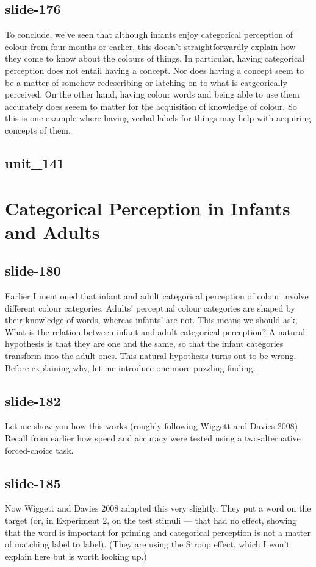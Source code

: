 \documentclass[12pt,\papersize]{extarticle}
\begin{document}
 
\subsection{slide-176}
To conclude, we've seen that although infants enjoy categorical perception of colour from four months or earlier,
this doesn't straightforwardly explain how they come to know about the colours of things.
In particular, having categorical perception does not entail having a concept.
Nor does having a concept seem to be a matter of somehow redescribing or latching on to what is catgeorically perceived.
On the other hand, having colour words and being able to use them accurately does seeem to matter for the acquisition of knowledge of colour.
So this is one example where having verbal labels for things may help with acquiring concepts of them.
 
 
\subsection{unit\_141}
 
\section{Categorical Perception in Infants and Adults}
 
 
\subsection{slide-180}
Earlier I mentioned that infant and adult categorical perception of colour involve different colour categories.
Adults’ perceptual colour categories are shaped by their knowledge of words, whereas infants’ are not.
This means we should ask, What is the relation between infant and adult categorical perception?
A natural hypothesis is that they are one and the same, so that the infant categories transform into the adult ones.
This natural hypothesis turns out to be wrong.
Before explaining why, let me introduce one more puzzling finding.
 
 
\subsection{slide-182}
Let me show you how this works (roughly following Wiggett and Davies 2008)
Recall from earlier how speed and accuracy were tested using a two-alternative forced-choice task.
 
 
\subsection{slide-185}
Now Wiggett and Davies 2008 adapted this very slightly.
They put a word on the target (or, in Experiment 2, on the test stimuli --- that had no effect, showing that the word is important for priming and categorical perception is not a matter of matching label to label).
(They are using the Stroop effect, which I won't explain here but is worth looking up.)
 
\end{document}
